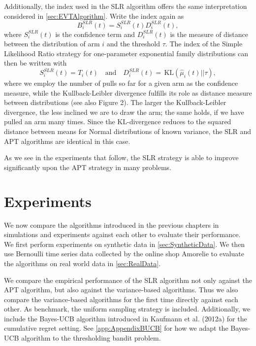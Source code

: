 \documentclass[11pt,]{article}
\newcommand{\KL}{\,\text{KL}}
\begin{document}
Additionally, the index used in the SLR algorithm offers the same
interpretation considered in \autoref{sec:EVTAlgorithm}. Write the index
again as \[
B_i^{SLR}(t) = S_i^{SLR}(t) D_i^{SLR}(t),
\] where \(S_i^{SLR}(t)\) is the confidence term and \(D_i^{SLR}(t)\) is
the measure of distance between the distribution of arm \(i\) and the
threshold \(\tau\). The index of the Simple Likelihood Ratio strategy
for one-parameter exponential family distributions can then be written
with \[
S_i^{SLR}(t) = T_i(t) \quad \text{and} \quad
D_i^{SLR}(t) = \KL(\hat{\mu}_i(t)||\tau),
\] where we employ the number of pulls so far for a given arm as the
confidence measure, while the Kullback-Leibler divergence fulfills its
role as distance measure between distributions (see also Figure 2). The
larger the Kullback-Leibler divergence, the less inclined we are to draw
the arm; the same holds, if we have pulled an arm many times. Since the
KL-divergence reduces to the squared distance between means for Normal
distributions of known variance, the SLR and APT algorithms are
identical in this case.

As we see in the experiments that follow, the SLR strategy is able to
improve significantly upon the APT strategy in many problems.

\newpage

\section{\texorpdfstring{Experiments
\label{chap:Experiments}}{Experiments }}\label{experiments}

We now compare the algorithms introduced in the previous chapters in
simulations and experiments against each other to evaluate their
performance. We first perform experiments on synthetic data in
\autoref{sec:SyntheticData}. We then use Bernoulli time series data
collected by the online shop Amorelie to evaluate the algorithms on real
world data in \autoref{sec:RealData}.

We compare the empirical performance of the SLR algorithm not only
against the APT algorithm, but also against the variance-based
algorithms. Thus we also compare the variance-based algorithms for the
first time directly against each other. As benchmark, the uniform
sampling strategy is included. Additionally, we include the Bayes-UCB
algorithm introduced in Kaufmann et al. (2012a) for the cumulative
regret setting. See \autoref{app:AppendixBUCB} for how we adapt the
Bayes-UCB algorithm to the thresholding bandit problem.
\end{document}
